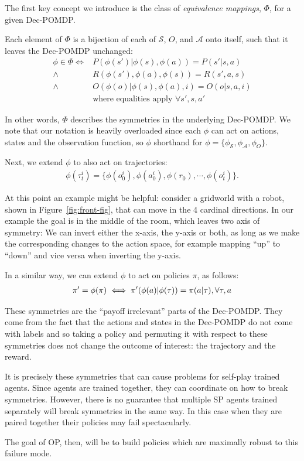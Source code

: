 The first key concept we introduce is the class of \textit{equivalence mappings}, $\Phi$, for a given Dec-POMDP.

Each element of $\Phi$ is a bijection of each of $\mathcal{S}$, $O$, and $\mathcal{A}$ onto itself, such that it leaves the Dec-POMDP unchanged:
\begin{align*}
   \phi \in \Phi \iff &  P(\phi(s')|\phi(s), \phi(a))  = P(s'|s,a) \\
    \land & R(\phi(s'),\phi(a), \phi(s) ) = R(s',a,s) \\
     \land & O(\phi(o)|\phi(s), \phi(a), i) = O(o|s, a, i) \\
     & \text{where equalities apply } \forall{s',s,a'}
\end{align*}

In other words, $\Phi$ describes the symmetries in the underlying Dec-POMDP. We note that our notation is heavily overloaded since each $\phi$ can act on actions, states and the observation function, so $\phi$ shorthand for $\phi = \{ \phi_\mathcal{S}, \phi_\mathcal{A}, \phi_O\}$. 

Next, we extend $\phi$ to also act on trajectories:
\begin{align*}
 \phi( \tau^i_t )= \{ \phi( o^i_0), \phi( a^i_0),  \phi( r_0), \cdots , \phi( o^i_t) \}.
\end{align*}

At this point an example might be helpful: consider a gridworld with a robot, shown in Figure~\ref{fig:front-fig}, that can move in the 4 cardinal directions. In our example the goal is in the middle of the room, which leaves two axis of symmetry: We can invert either the x-axis, the y-axis or both, as long as we make the corresponding changes to the action space, for example mapping ``up'' to ``down'' and vice versa when inverting the y-axis.

In a similar way, we can extend $\phi$ to act on policies $\pi$, as follows:
\begin{align*}
    \pi' = \phi(\pi) \iff \pi'(\phi(a)|\phi(\tau)) = \pi(a|\tau)\vspace{1mm},\vspace{1mm}\forall \tau, a
\end{align*}


These symmetries are the ``payoff irrelevant'' parts of the Dec-POMDP. They come from the fact that the actions and states in the Dec-POMDP do not come with labels and so taking a policy and permuting it with respect to these symmetries does not change the outcome of interest: the trajectory and the reward.

It is precisely these symmetries that can cause problems for self-play trained agents. Since agents are trained together, they can coordinate on how to break symmetries. However, there is no guarantee that multiple SP agents trained separately will break symmetries in the same way. In this case when they are paired together their policies may fail spectacularly.

The goal of OP, then, will be to build policies which are maximally robust to this failure mode.
